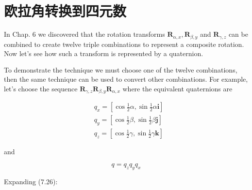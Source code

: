 \section{欧拉角转换到四元数}
In Chap. 6 we discovered that the rotation transforms $\mathbf{R}_{\alpha, x}, \mathbf{R}_{\beta, y}$ and $\mathbf{R}_{\gamma, z}$ can be combined to create twelve triple combinations to represent a composite rotation. Now let's see how such a transform is represented by a quaternion.

To demonstrate the technique we must choose one of the twelve combinations, then the same technique can be used to convert other combinations. For example, let's choose the sequence $\mathbf{R}_{\gamma, z} \mathbf{R}_{\beta, y} \mathbf{R}_{\alpha, x}$ where the equivalent quaternions are

$$
\begin{aligned}
& q_{x}=\left[\cos \frac{1}{2} \alpha, \sin \frac{1}{2} \alpha \mathbf{i}\right] \\
& q_{y}=\left[\cos \frac{1}{2} \beta, \sin \frac{1}{2} \beta \mathbf{j}\right] \\
& q_{z}=\left[\cos \frac{1}{2} \gamma, \sin \frac{1}{2} \gamma \mathbf{k}\right]
\end{aligned}
$$

and

$$
q=q_{z} q_{y} q_{x}
$$

Expanding (7.26):

